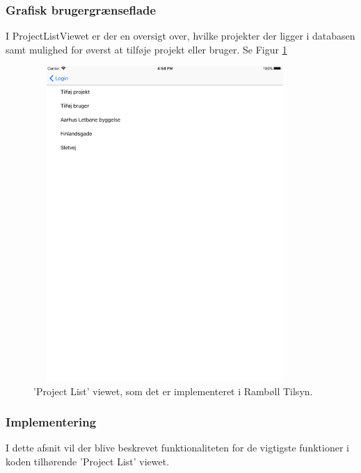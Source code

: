 \subsubsection{Grafisk brugergrænseflade}
I ProjectListViewet er der en oversigt over, hvilke projekter der ligger i databasen samt mulighed for øverst at tilføje projekt eller bruger. Se Figur \ref{fig:ProjectListView}
\begin{figure}[H] %
	\centering
	\includegraphics[height=12cm, width=10cm]{../ArkitekturDesign/Design/ProjectList/ProjectList}
	\caption{'Project List' viewet, som det er implementeret i Rambøll Tilsyn.}
	\label{fig:ProjectListView}
\end{figure}

\clearpage

\subsubsection{Implementering}
I dette afsnit vil der blive beskrevet funktionaliteten for de vigtigste funktioner i koden tilhørende 'Project List' viewet.

